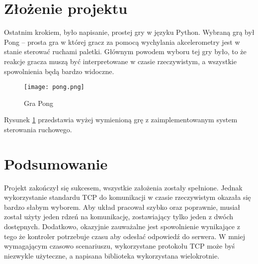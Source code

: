 \section{Złożenie projektu}
    Ostatnim krokiem, było napisanie, prostej gry w języku Python.
    Wybraną grą był Pong -- prosta gra w której gracz za pomocą wychylania akcelerometry jest w stanie sterować ruchami paletki.
    Głównym powodem wyboru tej gry było, to że reakcje gracza muszą być interpretowane w czasie rzeczywistym, a wszystkie spowolnienia będą bardzo widoczne.
    \begin{figure}[!ht]
        \centering
        \texttt{[image: pong.png]}
        \caption{Gra Pong}
        \label{fig:pong}
    \end{figure}

    Rysunek \ref{fig:pong} przedstawia wyżej wymienioną grę z zaimplementowanym system sterowania ruchowego.

\section{Podsumowanie}
    Projekt zakończył się sukcesem, wszystkie założenia zostały spełnione.
    Jednak wykorzystanie standardu TCP do komunikacji w czasie rzeczywistym okazała się bardzo słabym wyborem.
    Aby układ pracował szybko oraz poprawnie, musiał został użyty jeden rdzeń na komunikację, zostawiający tylko jeden z dwóch dostępnych.
    Dodatkowo, okazyjnie zauważalne jest spowolnienie wynikające z tego że kontroler potrzebuje czasu aby odesłać odpowiedź do serwera.
    W mniej wymagającym czasowo scenariuszu, wykorzystane protokołu TCP może byś niezwykle użyteczne, a napisana biblioteka wykorzystana wielokrotnie.